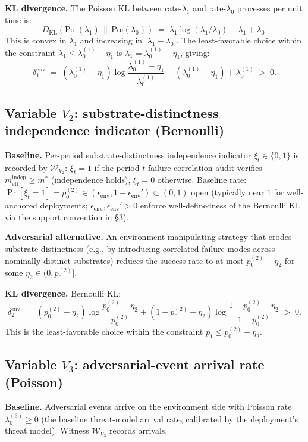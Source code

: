 \documentclass{article}
\newcommand{\Witness}{\mathcal{W}}
\newcommand{\mindep}{m_{\mathrm{eff}}^{\mathrm{indep}}}
\newcommand{\eenv}{\epsilon_{\mathrm{env}}}
\begin{document}
\textbf{KL divergence.}  The Poisson KL between rate-$\lambda_1$ and
rate-$\lambda_0$ processes per unit time is:
\[
  D_{\mathrm{KL}}(\mathrm{Poi}(\lambda_1) \,\|\,
  \mathrm{Poi}(\lambda_0)) \;=\; \lambda_1 \log(\lambda_1 /
  \lambda_0) - \lambda_1 + \lambda_0.
\]
This is convex in $\lambda_1$ and increasing in
$|\lambda_1 - \lambda_0|$.  The least-favorable choice within the
constraint $\lambda_1 \leq \lambda_0^{(1)} - \eta_1$ is
$\lambda_1 = \lambda_0^{(1)} - \eta_1$, giving:
\[
  \delta_1^{\mathrm{env}} \;=\; (\lambda_0^{(1)} - \eta_1)
  \log\!\frac{\lambda_0^{(1)} - \eta_1}{\lambda_0^{(1)}} -
  (\lambda_0^{(1)} - \eta_1) + \lambda_0^{(1)} \;>\; 0.
\]

\subsection{Variable $V_2$: substrate-distinctness independence
indicator (Bernoulli)}

\textbf{Baseline.}  Per-period substrate-distinctness independence
indicator $\xi_t \in \{0, 1\}$ is recorded by $\Witness_{V_2}$:
$\xi_t = 1$ if the period-$t$ failure-correlation audit verifies
$\mindep \geq m^*$ (independence holds), $\xi_t = 0$ otherwise.
Baseline rate: $\Pr[\xi_t = 1] = p_0^{(2)} \in (\eenv, 1 - \eenv')
\subset (0, 1)$ open (typically near $1$ for well-anchored
deployments; $\eenv, \eenv' > 0$ enforce well-definedness of the
Bernoulli KL via the support convention in §3).

\textbf{Adversarial alternative.}  An environment-manipulating
strategy that erodes substrate distinctness (e.g., by introducing
correlated failure modes across nominally distinct substrates)
reduces the success rate to at most $p_0^{(2)} - \eta_2$ for some
$\eta_2 \in (0, p_0^{(2)}]$.

\textbf{KL divergence.}  Bernoulli KL:
\[
  \delta_2^{\mathrm{env}} \;=\; (p_0^{(2)} - \eta_2)
  \log\!\frac{p_0^{(2)} - \eta_2}{p_0^{(2)}} +
  (1 - p_0^{(2)} + \eta_2) \log\!\frac{1 - p_0^{(2)} + \eta_2}
  {1 - p_0^{(2)}} \;>\; 0.
\]
This is the least-favorable choice within the constraint
$p_1 \leq p_0^{(2)} - \eta_2$.

\subsection{Variable $V_3$: adversarial-event arrival rate
(Poisson)}

\textbf{Baseline.}  Adversarial events arrive on the environment
side with Poisson rate $\lambda_0^{(3)} \geq 0$ (the baseline
threat-model arrival rate, calibrated by the deployment's threat
model).  Witness $\Witness_{V_3}$ records arrivals.
\end{document}
